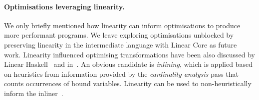 \documentclass[acmsmall,review,screen]{acmart}
\begin{document}


\paragraph{Optimisations leveraging linearity.}
We only briefly mentioned how linearity can inform optimisations to produce
more performant programs. We leave exploring optimisations unblocked by
preserving linearity in the intermediate language with Linear Core as future
work. Linearity influenced optimising transformations have been also discussed
by Linear Haskell~\cite{cite:linearhaskell} and
in~\cite{cite:let-floating,peytonjones1997a}. An obvious candidate is
\emph{inlining}, which is applied based on heuristics from information provided
by the \emph{cardinality analysis} pass that counts occurrences of bound
variables.  Linearity can be used to non-heuristically inform
the inliner~\cite{cite:linearhaskell}.

\end{document}
